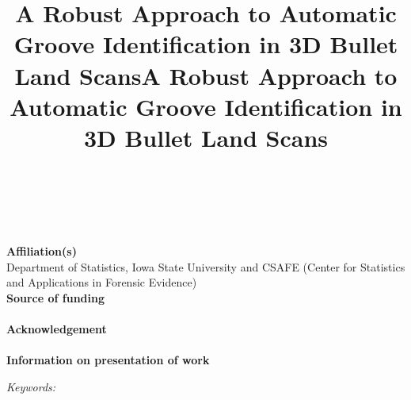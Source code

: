 \documentclass[12pt]{article}
\newcommand{\blind}{}
\begin{document}
\def\spacingset#1{\renewcommand{\baselinestretch}%
{#1}\small\normalsize} \spacingset{1}



\blind
{
  \title{\bf A Robust Approach to Automatic Groove Identification in 3D Bullet Land
Scans}

  \author{
        \\ %
    \\
      }
    \maketitle
  \bigskip
  \begin{center}
  {
  \textbf{Affiliation(s)}\\
  Department of Statistics, Iowa State University and CSAFE (Center for
  Statistics and Applications in Forensic Evidence)\\
  \bigskip
  \textbf{Source of funding}\\
  \\
  \bigskip
  \textbf{Acknowledgement}\\
  \\
  \bigskip
  \textbf{Information on presentation of work}\\
  
  }
  \end{center}

} \fi


\newpage

\blind
{
  \bigskip
  \bigskip
  \bigskip
  \begin{center}
  \title{\LARGE\bf A Robust Approach to Automatic Groove Identification in 3D Bullet Land
Scans}
  \end{center}
  \bigskip
  \maketitle
} \fi


\bigskip
\begin{abstract}

\end{abstract}

\noindent%
{\it Keywords:} 
\vfill

\newpage
\spacingset{1.45} %
\end{document}
